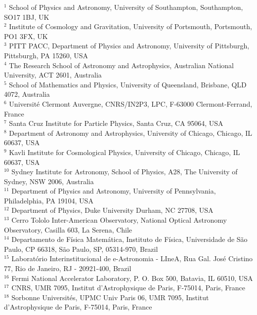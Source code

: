 \parbox{\textwidth}{
$^{1}$ School of Physics and Astronomy, University of Southampton,  Southampton, SO17 1BJ, UK\\
$^{2}$ Institute of Cosmology and Gravitation, University of Portsmouth, Portsmouth, PO1 3FX, UK\\
$^{3}$ PITT PACC, Department of Physics and Astronomy, University of Pittsburgh, Pittsburgh, PA 15260, USA\\
$^{4}$ The Research School of Astronomy and Astrophysics, Australian National University, ACT 2601, Australia\\
$^{5}$ School of Mathematics and Physics, University of Queensland,  Brisbane, QLD 4072, Australia\\
$^{6}$ Universit\'e Clermont Auvergne, CNRS/IN2P3, LPC, F-63000 Clermont-Ferrand, France\\
$^{7}$ Santa Cruz Institute for Particle Physics, Santa Cruz, CA 95064, USA\\
$^{8}$ Department of Astronomy and Astrophysics, University of Chicago, Chicago, IL 60637, USA\\
$^{9}$ Kavli Institute for Cosmological Physics, University of Chicago, Chicago, IL 60637, USA\\
$^{10}$ Sydney Institute for Astronomy, School of Physics, A28, The University of Sydney, NSW 2006, Australia\\
$^{11}$ Department of Physics and Astronomy, University of Pennsylvania, Philadelphia, PA 19104, USA\\
$^{12}$ Department of Physics, Duke University Durham, NC 27708, USA\\
$^{13}$ Cerro Tololo Inter-American Observatory, National Optical Astronomy Observatory, Casilla 603, La Serena, Chile\\
$^{14}$ Departamento de F\'isica Matem\'atica, Instituto de F\'isica, Universidade de S\~ao Paulo, CP 66318, S\~ao Paulo, SP, 05314-970, Brazil\\
$^{15}$ Laborat\'orio Interinstitucional de e-Astronomia - LIneA, Rua Gal. Jos\'e Cristino 77, Rio de Janeiro, RJ - 20921-400, Brazil\\
$^{16}$ Fermi National Accelerator Laboratory, P. O. Box 500, Batavia, IL 60510, USA\\
$^{17}$ CNRS, UMR 7095, Institut d'Astrophysique de Paris, F-75014, Paris, France\\
$^{18}$ Sorbonne Universit\'es, UPMC Univ Paris 06, UMR 7095, Institut d'Astrophysique de Paris, F-75014, Paris, France\\
}

